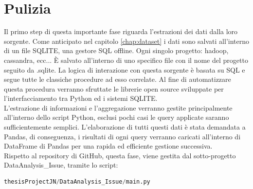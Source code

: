 \documentclass[%
    corpo=12pt,
    twoside,
    oldstyle,
    autoretitolo,
    greek,
    evenboxes,
]{toptesi}
\begin{document}
\section{Pulizia}
Il primo step di questa importante fase riguarda l'estrazioni dei dati dalla loro sorgente. Come anticipato nel capitolo \ref{chap:dataset} i dati sono salvati all'interno di un file SQLITE, una gestore SQL offline. Ogni singolo progetto: hadoop, cassandra, ecc... È salvato all'interno di uno specifico file con il nome del progetto seguito da .sqlite. La logica di interazione con questa sorgente è basata su SQL e segue tutte le classiche procedure ad esso correlate. Al fine di automatizzare questa procedura verranno sfruttate le librerie open source sviluppate per l'interfacciamento tra Python ed i sistemi SQLITE.\\
L'estrazione di informazioni e l'aggregazione verranno gestite principalmente all'interno dello script Python, esclusi pochi casi le query applicate saranno sufficientemente semplici. L'elaborazione di tutti questi dati è stata demandata a Pandas, di conseguenza, i risultati di ogni query verranno caricati all'interno di DataFrame di Pandas per una rapida ed efficiente gestione successiva.\\
Rispetto al repository di GitHub, questa fase, viene gestita dal sotto-progetto DataAnalysis\_Issue, tramite lo script:
\begin{lstlisting}[language=Python, frame=single]
  thesisProjectJN/DataAnalysis_Issue/main.py
\end{lstlisting}
\end{document}
